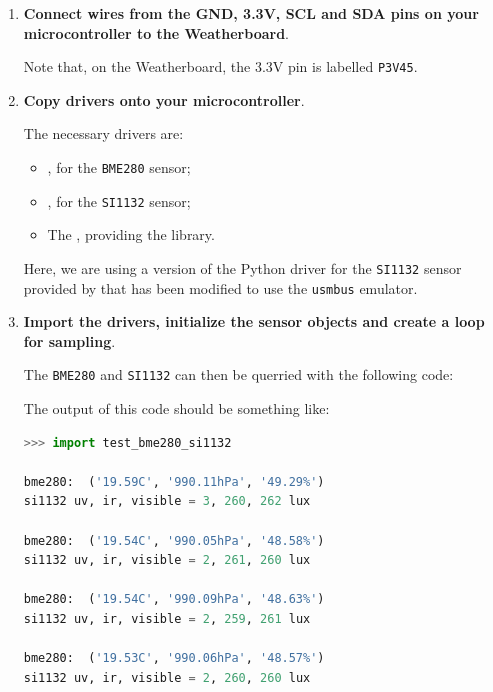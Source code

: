 \begin{enumerate}
	\item \textbf{Connect wires from the GND, 3.3V, SCL and SDA pins on your microcontroller to the Weatherboard}.

	Note that, on the Weatherboard, the 3.3V pin is labelled \texttt{P3V45}.

	\item \textbf{Copy drivers onto your microcontroller}.

	The necessary drivers are:
	\begin{itemize}
		\item {}, for the \texttt{BME280} sensor;
		\item {}, for the \texttt{SI1132} sensor;
		\item The , providing the \smbus library.
	\end{itemize}
	Here, we are using a version of the Python driver for the \texttt{SI1132} sensor provided by  that has been modified to use the \texttt{usmbus} \smbus emulator.

	\item \textbf{Import the drivers, initialize the sensor objects and create a loop for sampling}.

	The \texttt{BME280} and \texttt{SI1132} can then be querried with the following code:


The output of this code should be something like:
\begin{lstlisting}[language=Python]
>>> import test_bme280_si1132

bme280:  ('19.59C', '990.11hPa', '49.29%')
si1132 uv, ir, visible = 3, 260, 262 lux

bme280:  ('19.54C', '990.05hPa', '48.58%')
si1132 uv, ir, visible = 2, 261, 260 lux

bme280:  ('19.54C', '990.09hPa', '48.63%')
si1132 uv, ir, visible = 2, 259, 261 lux

bme280:  ('19.53C', '990.06hPa', '48.57%')
si1132 uv, ir, visible = 2, 260, 260 lux
\end{lstlisting}

\end{enumerate}


